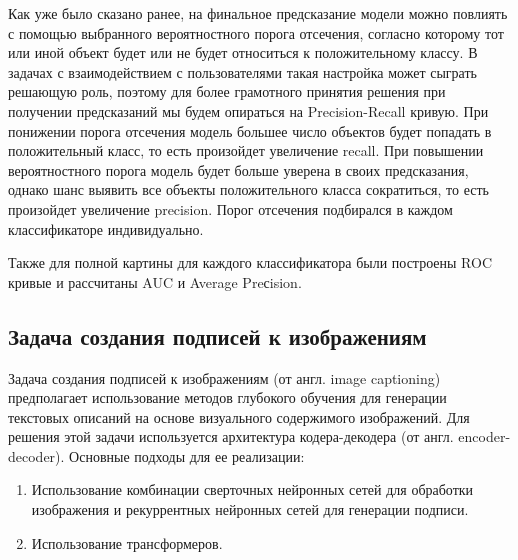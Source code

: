 \documentclass[a4paper,12pt]{extarticle}
\begin{document}
Как уже было сказано ранее, на финальное предсказание модели можно повлиять с помощью выбранного вероятностного порога отсечения, согласно которому тот или иной объект будет или не будет относиться к положительному классу. В задачах с взаимодействием с пользователями такая настройка может сыграть решающую роль, поэтому для более грамотного принятия решения при получении предсказаний мы будем опираться на Precision-Recall кривую. При понижении порога отсечения модель большее число объектов будет попадать в положительный класс, то есть произойдет увеличение recall. При повышении вероятностного порога модель будет больше уверена в своих предсказания, однако шанс выявить все объекты положительного класса сократиться, то есть произойдет увеличение precision. Порог отсечения подбирался в каждом классификаторе индивидуально.

Также для полной картины для каждого классификатора были построены ROC кривые и рассчитаны AUC и Average Preсision.





















\subsection{Задача создания подписей к изображениям}\label{subsection:image-captioning}

Задача создания подписей к изображениям (от англ. image captioning) предполагает использование методов глубокого обучения для генерации текстовых описаний на основе визуального содержимого изображений. Для решения этой задачи используется архитектура кодера-декодера (от англ. encoder-decoder). Основные подходы для ее реализации:
\begin{enumerate}[label=\arabic*.]
	\item Использование комбинации сверточных нейронных сетей для обработки изображения и рекуррентных нейронных сетей для генерации подписи. 
	\item Использование трансформеров. 
\end{enumerate}
\end{document}
